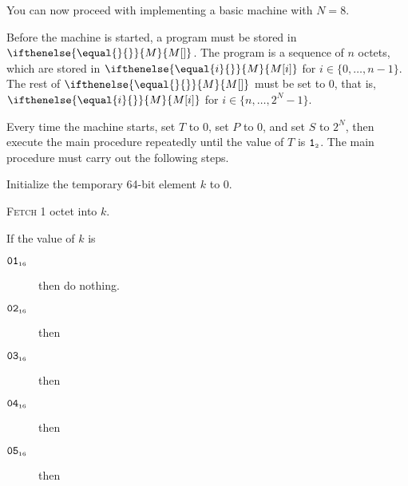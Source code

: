 \documentclass[a4paper,12pt]{article}
\newcommand{\num}[1]{\texttt{#1}}
\newcommand{\hex}[1]{\num{#1}_{\textup{\tiny 16}}}
\newcommand{\bin}[1]{\num{#1}_{\textup{\tiny 2}}}
\newcommand{\MEM}[1]{\ifthenelse{\equal{#1}{}}{M}{M[#1]}}
\newcommand{\PC}{P}
\newcommand{\SP}{S}
\newcommand{\TERM}{T}
\newcommand{\T}{\bin{1}}
\newcommand{\range}[2]{\{#1,\ldots,#2\}}
\newcommand{\proc}[1]{\textsc{#1}}
\newcommand{\op}[1]{$#1$}
\theoremstyle{definition}
\newcommand{\NOP}       [1]{\op{\hex{01}}}
\newcommand{\JUMP}      [1]{\op{\hex{02}}}
\newcommand{\JUMPZERO}  [1]{\op{\hex{03}}}
\newcommand{\SETSP}     [1]{\op{\hex{04}}}
\newcommand{\GETPC}     [1]{\op{\hex{05}}}
\begin{document}
You can now proceed with implementing a basic machine with $N=8$.

Before the machine is started, a program must be stored in $\MEM{}$.
The program is a sequence of $n$ octets, which are stored in $\MEM{i}$ for $i \in \range{0}{n-1}$.
The rest of $\MEM{}$ must be set to 0, that is, $\MEM{i}$ for $i \in \range{n}{2^N-1}$.

Every time the machine starts, set $\TERM$ to 0, set $\PC$ to $0$, and set $\SP$ to $2^N$, then execute the main procedure repeatedly until the value of $\TERM$ is $\T$.
The main procedure must carry out the following steps.
\begin{stepnumbers}
\item Initialize the temporary 64-bit element $k$ to 0.
\item \proc{Fetch} 1 octet into $k$.
\item\label{itm:main-case} If the value of $k$ is
  \begin{description}
  \item[\NOP{}] then do nothing.
  \item[\JUMP{}] then
  \item[\JUMPZERO{}] then
  \item[\SETSP{}] then
  \item[\GETPC{}] then

\end{description}
\end{stepnumbers}
\end{document}
